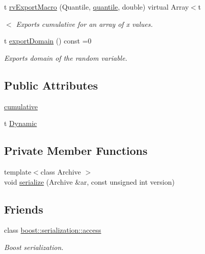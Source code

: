 \begin{DoxyCompactItemize}
\item 
t \hyperlink{class_t_random_variable_a1aaeb4946cfe03b02b5cd97b8bd0a4a3}{rv\-Export\-Macro} (Quantile, \hyperlink{class_c_random_variable_aad8f00777fdad0e7e1ad29c9ea620ff2}{quantile}, double) virtual Array$<$t
\begin{DoxyCompactList}\small\item\em $<$ Exports cumulative for an array of x values. \end{DoxyCompactList}\item 
t \hyperlink{class_t_random_variable_a37fc52d5fa37493a353887242d279a27}{export\-Domain} () const =0
\begin{DoxyCompactList}\small\item\em Exports domain of the random variable. \end{DoxyCompactList}\end{DoxyCompactItemize}
\subsection*{Public Attributes}
\begin{DoxyCompactItemize}
\item 
\hyperlink{class_t_random_variable_a85c929f5f072f475c65849859bfa1e5e}{cumulative}
\item 
t \hyperlink{class_t_random_variable_ad33d760f0f0d75be0de72fc811d7e130}{Dynamic}
\end{DoxyCompactItemize}
\subsection*{Private Member Functions}
\begin{DoxyCompactItemize}
\item 
{\footnotesize template$<$class Archive $>$ }\\void \hyperlink{class_t_random_variable_a66ab9533e23478aca1460391f8ab7b7a}{serialize} (Archive \&ar, const unsigned int version)
\end{DoxyCompactItemize}
\subsection*{Friends}
\begin{DoxyCompactItemize}
\item 
class \hyperlink{class_t_random_variable_ac98d07dd8f7b70e16ccb9a01abf56b9c}{boost\-::serialization\-::access}
\begin{DoxyCompactList}\small\item\em Boost serialization. \end{DoxyCompactList}\end{DoxyCompactItemize}
